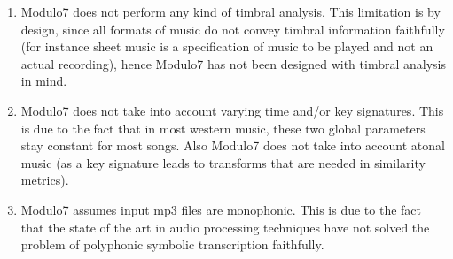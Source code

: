 \begin{enumerate}
\item Modulo7 does not perform any kind of timbral analysis. This limitation is by design, since all formats of music do not convey timbral information faithfully (for instance sheet music is a specification of music to be played and not an actual recording), hence Modulo7 has not been designed with timbral analysis in mind.
\item Modulo7 does not take into account varying time and/or key signatures. This is due to the fact that in most western music, these two global parameters stay constant for most songs. Also Modulo7 does not take into account atonal music (as a key signature leads to transforms that are needed in similarity metrics). 
\item Modulo7 assumes input mp3 files are monophonic. This is due to the fact that the state of the art in audio processing techniques have not solved the problem of polyphonic symbolic transcription faithfully. \cite{melextract}
\end{enumerate}
